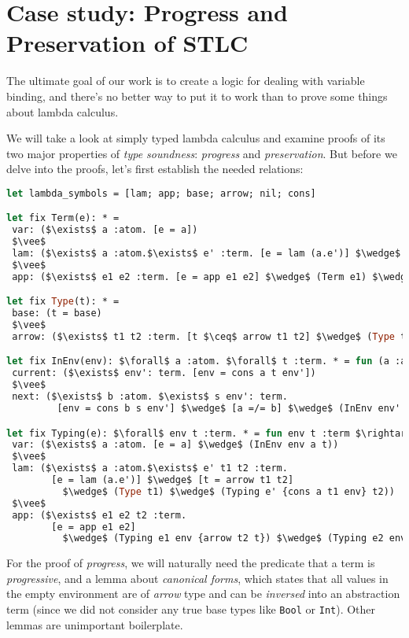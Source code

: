 \documentclass[english, mgr]{iithesis}
\renewcommand{\tt}[1]{\texttt{\small{#1}}}
\renewcommand{\it}[1]{\textit{#1}}
\begin{document}
\chapter{Case study: Progress and Preservation of STLC}

The ultimate goal of our work is to create a logic for dealing with variable binding,
and there's no better way to put it to work than to prove some things about lambda calculus.

We will take a look at simply typed lambda calculus and examine proofs of
its two major properties of \it{type soundness}: \it{progress} and \it{preservation}.
But before we delve into the proofs, let's first establish the needed relations:
\begin{lstlisting}[mathescape,language=OCaml]
let lambda_symbols = [lam; app; base; arrow; nil; cons]

let fix Term(e): * =
 var: ($\exists$ a :atom. [e = a])
 $\vee$
 lam: ($\exists$ a :atom.$\exists$ e' :term. [e = lam (a.e')] $\wedge$ (Term e'))
 $\vee$
 app: ($\exists$ e1 e2 :term. [e = app e1 e2] $\wedge$ (Term e1) $\wedge$ (Term e2))

let fix Type(t): * =
 base: (t = base)
 $\vee$
 arrow: ($\exists$ t1 t2 :term. [t $\ceq$ arrow t1 t2] $\wedge$ (Type t1) $\wedge$ (Type t2))

let fix InEnv(env): $\forall$ a :atom. $\forall$ t :term. * = fun (a :atom) (t :term) $\rightarrow$
 current: ($\exists$ env': term. [env = cons a t env'])
 $\vee$
 next: ($\exists$ b :atom. $\exists$ s env': term.
         [env = cons b s env'] $\wedge$ [a =/= b] $\wedge$ (InEnv env' a t))

let fix Typing(e): $\forall$ env t :term. * = fun env t :term $\rightarrow$
 var: ($\exists$ a :atom. [e = a] $\wedge$ (InEnv env a t))
 $\vee$
 lam: ($\exists$ a :atom.$\exists$ e' t1 t2 :term.
        [e = lam (a.e')] $\wedge$ [t = arrow t1 t2]
          $\wedge$ (Type t1) $\wedge$ (Typing e' {cons a t1 env} t2))
 $\vee$
 app: ($\exists$ e1 e2 t2 :term.
        [e = app e1 e2]
          $\wedge$ (Typing e1 env {arrow t2 t}) $\wedge$ (Typing e2 env t2))
\end{lstlisting}
For the proof of \it{progress}, we will naturally need the predicate
that a term is \it{progressive}, and a lemma about \it{canonical forms},
which states that all values in the empty environment
are of \it{arrow} type and can be \it{inversed} into an abstraction term
(since we did not consider any true base types like \tt{Bool} or \tt{Int}).
Other lemmas are unimportant boilerplate.
\end{document}

